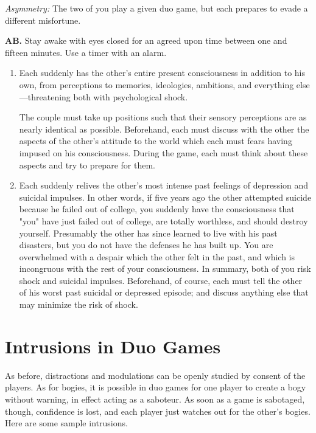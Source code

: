 \emph{Asymmetry:} The two of you play a given duo game, but each prepares 
to evade a different misfortune. 

\textbf{AB.} Stay awake with eyes closed for an agreed upon time between one 
and fifteen minutes. Use a timer with an alarm. 

\begin{enumerate}
\item Each suddenly has the other's entire present consciousness in addition to 
his own, from perceptions to memories, ideologies, ambitions, and 
everything else---threatening both with psychological shock. 

The couple must take up positions such that their sensory perceptions 
are as nearly identical as possible. Beforehand, each must discuss with the 
other the aspects of the other's attitude to the world which each must fears 
having impused on his consciousness. During the game, each must think 
about these aspects and try to prepare for them. 

\item Each suddenly relives the other's most intense past feelings of depression 
and suicidal impulses. In other words, if five years ago the other attempted 
suicide because he failed out of college, you suddenly have the consciousness 
that "you" have just failed out of college, are totally worthless, and should 
destroy yourself. Presumably the other has since learned to live with his past 
disasters, but you do not have the defenses he has built up. You are 
overwhelmed with a despair which the other felt in the past, and which is 
incongruous with the rest of your consciousness. In summary, both of you 
risk shock and suicidal impulses. Beforehand, of course, each must tell the 
other of his worst past suicidal or depressed episode; and discuss anything 
else that may minimize the risk of shock. 
\end{enumerate}

\section*{Intrusions in Duo Games}

As before, distractions and modulations can be openly studied by 
consent of the players. As for bogies, it is possible in duo games for one 
player to create a bogy without warning, in effect acting as a saboteur. As 
soon as a game is sabotaged, though, confidence is lost, and each player just 
watches out for the other's bogies. Here are some sample intrusions. 

